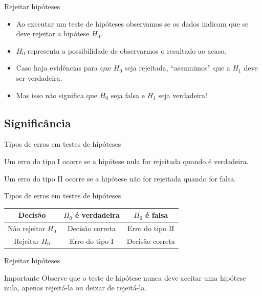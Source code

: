 \documentclass{beamer}
\begin{document}
\begin{frame}{Rejeitar hipóteses}
  \begin{itemize}
  \item Ao executar um teste de hipóteses observamos se os dados
    indicam que se deve rejeitar a hipótese $H_0$.
  \item $H_0$ representa a possibilidade de observarmos o resultado ao
    acaso.
  \item Caso haja evidências para que $H_0$ seja rejeitada,
    ``assumimos'' que a $H_1$ deve ser verdadeira.
  \item Mas isso não significa que $H_0$ seja falsa e $H_1$ seja verdadeira!
  \end{itemize}
\end{frame}

\subsection{Significância}

\begin{frame}{Tipos de erros em testes de hipóteses}
  \begin{definition}
    Um \alert{erro do tipo I} ocorre se a hipótese nula for rejeitada
    quando é verdadeira.
  \end{definition}
  \begin{definition}
    Um \alert{erro do tipo II} ocorre se a hipótese não for rejeitada
    quando for falsa.
  \end{definition}
\end{frame}

\begin{frame}{Tipos de erros em testes de hipóteses}
  \begin{tabular}{c||c|c}
    Decisão & $H_0$ é verdadeira & $H_0$ é falsa \\
    \hline
    \hline
    Não rejeitar $H_0$ & Decisão correta & Erro do tipo II\\
    \hline
    Rejeitar $H_0$ & Erro do tipo I & Decisão correta\\
  \end{tabular}
\end{frame}

\begin{frame}{Rejeitar hipóteses}
  \begin{block}{Importante}
    Observe que o teste de hipótese nunca deve \alert{aceitar} uma
    hipótese nula, apenas rejeitá-la ou deixar de rejeitá-la.
  \end{block}
\end{frame}
\end{document}
